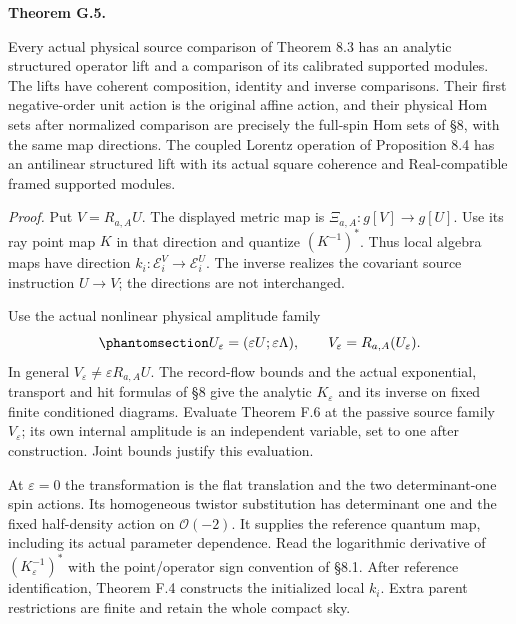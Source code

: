 \documentclass[
  english,
  11pt,
  reqno]{amsart}
\makeatletter
\newcommand{\pandocstatementheading}[1]{%
  \par\addpenalty{\@beginparpenalty}%
  \addvspace{.5\baselineskip plus .2\baselineskip minus .2\baselineskip}%
  {\normalfont\bfseries #1\par}%
  \nobreak\@afterindenttrue\@afterheading
}
\makeatother
\begin{document}
\pandocstatementheading{\protect{}\label{thm:gg-op-physical-comparisons}Theorem G.5.}

Every actual physical source comparison of Theorem 8.3 has an analytic
structured operator lift and a comparison of its calibrated supported
modules. The lifts have coherent composition, identity and inverse
comparisons. Their first negative-order unit action is the original
affine action, and their physical Hom sets after normalized comparison
are precisely the full-spin Hom sets of §8, with the same map
directions. The coupled Lorentz operation of Proposition 8.4 has an
antilinear structured lift with its actual square coherence and
Real-compatible framed supported modules.

\emph{Proof.} Put \(V=R_{a,A}U\). The displayed metric map is
\(\Xi_{a,A}:g[V]\to g[U]\). Use its ray point map \(K\) in that
direction and quantize \((K^{-1})^*\). Thus local algebra maps have
direction \(k_i:\mathcal E_i^V\to\mathcal E_i^U\). The inverse realizes
the covariant source instruction \(U\to V\); the directions are not
interchanged.

Use the actual nonlinear physical amplitude family
\begin{equation}\protect\phantomsection\label{eq:gg-op-physical-amplitude}{
 U_\varepsilon=(\varepsilon U;\varepsilon\Lambda),
 \qquad V_\varepsilon=R_{a,A}(U_\varepsilon).
}\end{equation} In general \(V_\varepsilon\ne\varepsilon R_{a,A}U\). The
record-flow bounds and the actual exponential, transport and hit
formulas of §8 give the analytic \(K_\varepsilon\) and its inverse on
fixed finite conditioned diagrams. Evaluate Theorem F.6 at the passive
source family \(V_\varepsilon\); its own internal amplitude is an
independent variable, set to one after construction. Joint bounds
justify this evaluation.

At \(\varepsilon=0\) the transformation is the flat translation and the
two determinant-one spin actions. Its homogeneous twistor substitution
has determinant one and the fixed half-density action on
\(\mathcal O(-2)\). It supplies the reference quantum map, including its
actual parameter dependence. Read the logarithmic derivative of
\((K_\varepsilon^{-1})^*\) with the point/operator sign convention of
§8.1. After reference identification, Theorem F.4 constructs the
initialized local \(k_i\). Extra parent restrictions are finite and
retain the whole compact sky.
\end{document}
